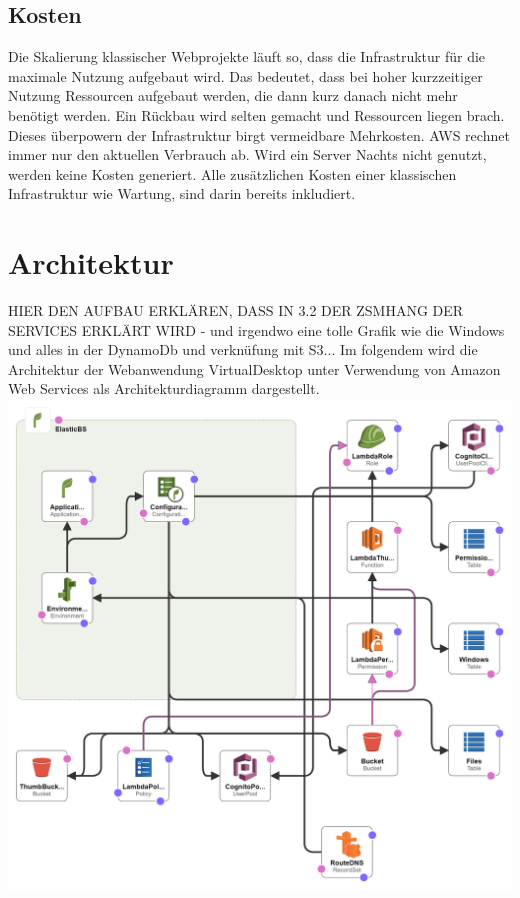 \documentclass[a4paper, 12pt]{scrreprt}
\begin{document}
\section{Kosten}
Die Skalierung klassischer Webprojekte läuft so, dass die Infrastruktur für die maximale Nutzung aufgebaut wird. Das bedeutet, dass bei hoher kurzzeitiger Nutzung Ressourcen aufgebaut werden, die dann kurz danach nicht mehr benötigt werden. Ein Rückbau wird selten gemacht und Ressourcen liegen brach.\\
Dieses überpowern der Infrastruktur birgt vermeidbare Mehrkosten. AWS rechnet immer nur den aktuellen Verbrauch ab. Wird ein Server Nachts nicht genutzt, werden keine Kosten generiert. Alle zusätzlichen Kosten einer klassischen Infrastruktur wie Wartung, sind darin bereits inkludiert. 
\chapter{Architektur}
HIER DEN AUFBAU ERKLÄREN, DASS IN 3.2 DER ZSMHANG DER SERVICES ERKLÄRT WIRD
- und irgendwo eine tolle Grafik wie die Windows und alles in der DynamoDb und verknüfung mit S3...
Im folgendem wird die Architektur der Webanwendung VirtualDesktop unter Verwendung von Amazon Web Services als Architekturdiagramm dargestellt.
\\
\includegraphics[scale=0.25]{template1-designer.png} 
\end{document}
